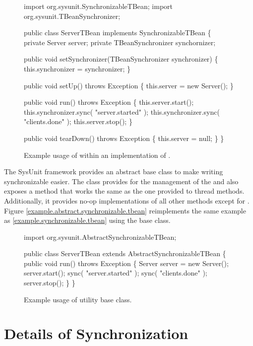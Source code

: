 \begin{figure}
\begin{codelisting}
import org.sysunit.SynchronizableTBean;
import org.sysunit.TBeanSynchronizer;

public class ServerTBean 
    implements SynchronizableTBean
\{
    private Server server;
    private TBeanSynchronizer synchornizer;

    public void setSynchronizer(TBeanSynchronizer synchronizer)
    \{
        this.synchronizer = synchronizer;
    \}

    public void setUp() 
        throws Exception
    \{
        this.server = new Server();
    \}

    public void run()
        throws Exception
    \{
        this.server.start();
        this.synchronizer.sync( "server.started" );
        this.synchronizer.sync( "clients.done" );
        this.server.stop();
    \}

    public void tearDown()
        throws Exception
    \{
        this.server = null;
    \}
\}
\end{codelisting}
\caption{Example usage of  within
an implementation of .}
\label{example.synchronizable.tbean}
\end{figure}

The SysUnit framework provides an abstract base class to make
writing synchronizable  easier.  The
class provides for the management of the
and also exposes a
method that works the same as the one provided to thread methods.
Additionally, it provides no-op implementations of all
other methods except for .
Figure \vref{example.abstract.synchronizable.tbean} reimplements
the same example as \vref{example.synchronizable.tbean} using
the  base class.

\begin{figure}
\begin{codelisting}
import org.sysunit.AbstractSynchronizableTBean;

public class ServerTBean
    extends AbstractSynchronizableTBean
\{
    public void run()
        throws Exception
    \{
        Server server = new Server();
        server.start();
        sync( "server.started" );
        sync( "clients.done" );
        server.stop();
    \}
\}
\end{codelisting}
\caption{Example usage of 
utility base class.}
\label{example.abstract.synchronizable.tbean}
\end{figure}


\section{Details of Synchronization}

